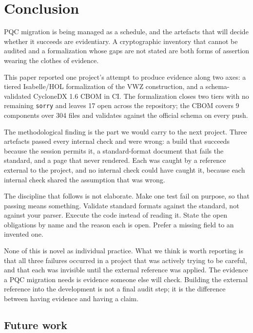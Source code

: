 \section{Conclusion}
\label{sec:conclusion}

PQC migration is being managed as a schedule, and the artefacts that will decide
whether it succeeds are evidentiary. A cryptographic inventory that cannot be
audited and a formalization whose gaps are not stated are both forms of
assertion wearing the clothes of evidence.

This paper reported one project's attempt to produce evidence along two axes:
a tiered Isabelle/HOL formalization of the VWZ construction, and a
schema-validated CycloneDX 1.6 CBOM in CI. The formalization closes two tiers
with no remaining \texttt{sorry} and leaves 17 open across the repository; the
CBOM covers 9 components over 304 files and validates against the official
schema on every push.

The methodological finding is the part we would carry to the next project. Three
artefacts passed every internal check and were wrong: a build that succeeds
because the session permits it, a standard-format document that fails the
standard, and a page that never rendered. Each was caught by a reference external
to the project, and no internal check could have caught it, because each internal
check shared the assumption that was wrong.

The discipline that follows is not elaborate. Make one test fail on purpose, so
that passing means something. Validate standard formats against the standard, not
against your parser. Execute the code instead of reading it. State the open
obligations by name and the reason each is open. Prefer a missing field to an
invented one.

None of this is novel as individual practice. What we think is worth reporting is
that all three failures occurred in a project that was actively trying to be
careful, and that each was invisible until the external reference was applied.
The evidence a PQC migration needs is evidence someone else will check. Building
the external reference into the development is not a final audit step; it is the
difference between having evidence and having a claim.

\subsection{Future work}

